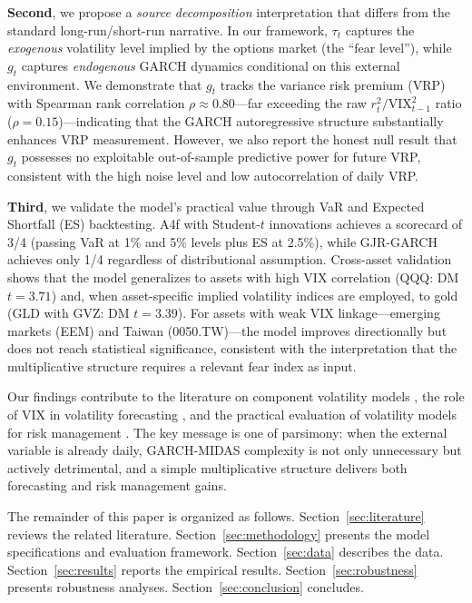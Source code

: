 \documentclass[12pt,a4paper]{article}
\begin{document}
\textbf{Second}, we propose a \emph{source decomposition} interpretation that differs from the standard long-run/short-run narrative. In our framework, $\tau_t$ captures the \emph{exogenous} volatility level implied by the options market (the ``fear level''), while $g_t$ captures \emph{endogenous} GARCH dynamics conditional on this external environment. We demonstrate that $g_t$ tracks the variance risk premium (VRP) with Spearman rank correlation $\rho \approx 0.80$---far exceeding the raw $r_t^2 / \mathrm{VIX}_{t-1}^2$ ratio ($\rho = 0.15$)---indicating that the GARCH autoregressive structure substantially enhances VRP measurement. However, we also report the honest null result that $g_t$ possesses no exploitable out-of-sample predictive power for future VRP, consistent with the high noise level and low autocorrelation of daily VRP.

\textbf{Third}, we validate the model's practical value through VaR and Expected Shortfall (ES) backtesting. A4f with Student-$t$ innovations achieves a scorecard of 3/4 (passing VaR at 1\% and 5\% levels plus ES at 2.5\%), while GJR-GARCH achieves only 1/4 regardless of distributional assumption. Cross-asset validation shows that the model generalizes to assets with high VIX correlation (QQQ: DM $t = 3.71$) and, when asset-specific implied volatility indices are employed, to gold (GLD with GVZ: DM $t = 3.39$). For assets with weak VIX linkage---emerging markets (EEM) and Taiwan (0050.TW)---the model improves directionally but does not reach statistical significance, consistent with the interpretation that the multiplicative structure requires a relevant fear index as input.

Our findings contribute to the literature on component volatility models \citep{engle2008, engle2013, conrad2015, conrad2020}, the role of VIX in volatility forecasting \citep{bekaert2014, bayer2020}, and the practical evaluation of volatility models for risk management \citep{patton2011, hansen2011}. The key message is one of parsimony: when the external variable is already daily, GARCH-MIDAS complexity is not only unnecessary but actively detrimental, and a simple multiplicative structure delivers both forecasting and risk management gains.

The remainder of this paper is organized as follows. Section~\ref{sec:literature} reviews the related literature. Section~\ref{sec:methodology} presents the model specifications and evaluation framework. Section~\ref{sec:data} describes the data. Section~\ref{sec:results} reports the empirical results. Section~\ref{sec:robustness} presents robustness analyses. Section~\ref{sec:conclusion} concludes.
\end{document}
